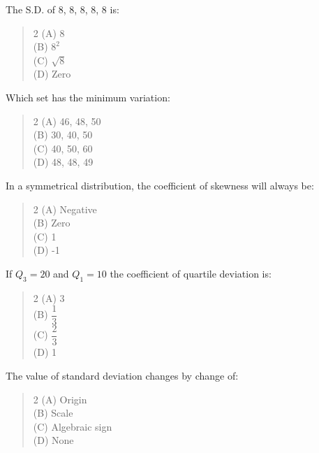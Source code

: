 \documentclass[11pt,a4paper]{article}
\begin{document}
\begin{mcqlist}
\item The S.D. of 8, 8, 8, 8, 8 is:
\begin{quote}\begin{multicols}{2}
\noindent (A) 8 \\
(B) $8^2$ \\
(C) $\sqrt{8}$ \\
(D) Zero
\end{multicols}\end{quote}

\item Which set has the minimum variation:
\begin{quote}\begin{multicols}{2}
\noindent (A) 46, 48, 50 \\
(B) 30, 40, 50 \\
(C) 40, 50, 60 \\
(D) 48, 48, 49
\end{multicols}\end{quote}

\item In a symmetrical distribution, the coefficient of skewness will always be:
\begin{quote}\begin{multicols}{2}
\noindent (A) Negative \\
(B) Zero \\
(C) 1 \\
(D) -1
\end{multicols}\end{quote}

\item If $Q_3=20$ and $Q_1=10$ the coefficient of quartile deviation is:
\begin{quote}\begin{multicols}{2}
\noindent (A) 3 \\
(B) $\dfrac{1}{3}$ \\
(C) $\dfrac{2}{3}$ \\
(D) 1
\end{multicols}\end{quote}

\item The value of standard deviation changes by change of:
\begin{quote}\begin{multicols}{2}
\noindent (A) Origin \\
(B) Scale \\
(C) Algebraic sign \\
(D) None
\end{multicols}\end{quote}


\end{mcqlist}
\end{document}
